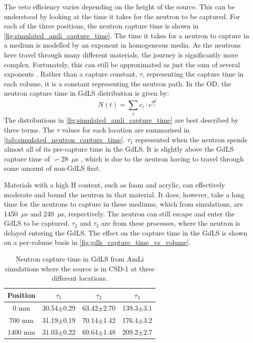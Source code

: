 \par
The veto efficiency varies depending on the height of the source.
This can be understood by looking at the time it takes for the neutron to be captured.
For each of the three positions, the neutron capture time is shown in \autoref{fig:simulated_amli_capture_time}.
The time it takes for a neutron to capture in a medium is modelled by an exponent in homogeneous media.
As the neutrons here travel through many different materials, the journey is significantly more complex.
Fortunately, this can still be approximated as just the sum of several exponents \cite{Dayabay_neutron_capture_fit_ref}.
Rather than a capture constant, $\tau$, representing the capture time in each volume, it is a constant representing the neutron path.
In the OD, the neutron capture time in GdLS distribution is given by:
\begin{equation}
    N(t) = \sum_{i} c_i \cdot e^{\frac{-t}{t_i}}
\label{eq:neutron_capture_time}
\end{equation}
The distributions in \autoref{fig:simulated_amli_capture_time} are best described by three terms.
The $\tau$ values for each location are summarised in \autoref{tab:simulated_neutron_capture_time}.
$\tau_1$ represented when the neutron spends almost all of its pre-capture time in the GdLS.
It is slightly above the GdLS capture time of $\backsim$28~$\mu$s \cite{ucsb_gdls_dicebox_simulations_ref}, which is due to the neutron having to travel through some amount of non-GdLS first.
\par
Materials with a high H content, such as foam and acrylic, can effectively moderate and bound the neutron in that material.
It does, however, take a long time for the neutrons to capture in these mediums, which from simulations, are 1450~$\mu$s and 240~$\mu$s, respectively.
The neutron can still escape and enter the GdLS to be captured.
$\tau_2$ and $\tau_3$ are from these processes, where the neutron is delayed entering the GdLS.
The effect on the capture time in the GdLS is shown on a per-volume basis in \autoref{fig:gdls_capture_time_vs_volume}.

\begin{table}[]
    \centering
    \begin{tabular}{c|c|c|c}
        Position  &  $\tau_1$      & $\tau_2$       & $\tau_3$        \\ \hline
        0 mm      & 30.54$\pm$0.29 & 63.42$\pm$2.70 & 139.3$\pm$3.1   \\ 
        700 mm    & 31.19$\pm$0.19 & 70.14$\pm$1.42 & 176.4$\pm$3.2   \\
        1400 mm   & 31.03$\pm$0.22 & 69.64$\pm$1.48 & 209.2$\pm$2.7         
    \end{tabular}
    \caption{Neutron capture time in GdLS from AmLi simulations where the source is in CSD-1 at three different locations.}
    \label{tab:simulated_neutron_capture_time}
\end{table}

